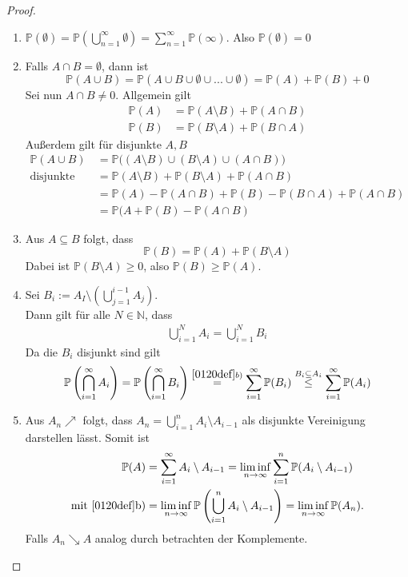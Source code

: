 \documentclass[10pt,a4paper]{article}
\newcommand{\N}{\ensuremath{\mathbb{N}}}
\newcommand{\Prb}{\mathbb P}
\theoremstyle{plain}
\theoremstyle{definition}
\theoremstyle{remark}
\begin{document}
	\begin{proof}
		\begin{enumerate}[label=\alph*)]
			\item $\Prb(\emptyset)=\Prb\left(\bigcup_{n=1}^\infty \emptyset\right)=\sum_{n=1}^{\infty}\Prb(\infty)$. Also $\Prb(\emptyset)=0$
			
			\item Falls $A\cap B=\emptyset$, dann ist 
			\[\Prb(A\cup B)=\Prb(A\cup B\cup\emptyset\cup...\cup\emptyset)=\Prb(A)+\Prb(B)+0\]
			Sei nun $A\cap B\neq 0$. Allgemein gilt
			\begin{align*}
			\Prb(A)&=\Prb(A\setminus B)+\Prb(A\cap B)\\
			\Prb(B)&=\Prb(B\setminus A)+\Prb(B\cap A)
			\end{align*}
			Außerdem gilt für disjunkte $A,B$
			\begin{align*}
			\Prb(A\cup B)&=\Prb\big((A\setminus B)\cup(B\setminus A)\cup(A\cap B)\big)\\
			\text{disjunkte Mengen}\,&=\Prb(A\setminus B)+\Prb(B\setminus A)+\Prb(A\cap B)\\
			&=\Prb(A)-\Prb(A\cap B)+\Prb(B)-\Prb(B\cap A)+\Prb(A\cap B)\\
			&=\Prb(A+\Prb(B)-\Prb(A\cap B)
			\end{align*}
			
			\item Aus $A\subseteq B$ folgt, dass 
			\[\Prb(B)=\Prb(A)+\Prb(B\setminus A)\]
			Dabei ist $\Prb(B\setminus A)\geq 0$, also $\Prb(B)\geq \Prb(A)$.
			
			\item Sei $B_i:= A_I\setminus\left(\bigcup_{j=1}^{i-1}A_j\right)$.\\
			Dann gilt für alle $N\in\N$, dass
			\begin{align*}
			\bigcup_{i=1}^N A_i=\bigcup_{i=1}^N B_i
			\end{align*}
			Da die $B_i$ disjunkt sind gilt
			\[\Prb\left(\bigcap_{i=1}^\infty A_i\right)=\Prb\left(\bigcap_{i=1}^\infty B_i\right)\overset{\ref{0120def}b)}{=}\sum_{i=1}^{\infty}\Prb(B_i)\overset{B_i\subseteq A_i}{\leq}\sum_{i=1}^{\infty}\Prb(A_i)\]
			
			\item Aus $A_n\nearrow$ folgt, dass $A_n=\bigcup_{i=1}^nA_i\setminus A_{i-1}$ als disjunkte Vereinigung darstellen lässt. Somit ist
			\begin{align*}
			\Prb(A)&=\sum_{i=1}^{\infty}A_i\setminus A_{i-1}
			=\liminf_{n\to\infty}\sum_{i=1}^{n}\Prb(A_i\setminus A_{i-1})\\
			\text{mit \ref{0120def}b)}&=\liminf_{n\to\infty}\Prb\left(\bigcup_{i=1}^n A_i\setminus A_{i-1}\right)=\liminf_{n\to\infty}\Prb(A_n).
			\end{align*}
			Falls $A_n\searrow A$ analog durch betrachten der Komplemente.
		\end{enumerate}
	\end{proof}
	
\end{document}
